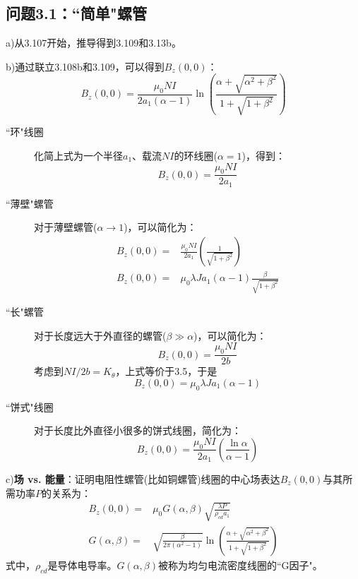 \subsection{问题3.1：``简单"螺管}
a)从3.107开始，推导得到3.109和3.13b。

b)通过联立3.108b和3.109，可以得到$B_z(0,0)$：
\begin{equation}
B_z(0,0)=\frac{\mu_0NI}{2a_1(\alpha-1)}\ln\left(\frac{\alpha+\sqrt{\alpha^2+\beta^2}}{1+\sqrt{1+\beta^2}}\right)%
\end{equation}

\begin{description}
  \item[``环"线圈] 化简上式为一个半径$a_1$、载流$NI$的环线圈($\alpha=1$)，得到：
  \begin{equation}
    B_z(0,0)=\frac{\mu_0NI}{2a_1}%
  \end{equation}
 \item[``薄壁"螺管] 对于薄壁螺管($\alpha \rightarrow 1$)，可以简化为：
 \begin{align*}
   B_z(0,0)=&\frac{\mu_0NI}{2a_1}\left(\frac{1}{\sqrt{1+\beta^2}}\right)\tag{3.111b}\\ %
   B_z(0,0)=&\mu_0 \lambda Ja_1(\alpha-1)\frac{\beta}{\sqrt{1+\beta^2}}\tag{3.111c}%
 \end{align*}
  \item[``长"螺管] 对于长度远大于外直径的螺管($\beta \gg \alpha$)，可以简化为：
\begin{equation*}
B_z(0,0)=\frac{\mu_0NI}{2b} \tag{3.111d}%
\end{equation*}
考虑到$NI/2b=K_\theta$，上式等价于3.5，于是
\begin{equation*}
B_z(0,0)=\mu_0\lambda Ja_1(\alpha-1) \tag{3.111e}%
\end{equation*}
  \item[``饼式"线圈] 对于长度比外直径小很多的饼式线圈，简化为：
  \begin{equation*}
B_z(0,0)=\frac{\mu_0NI}{2a_1}(\frac{\ln\alpha}{\alpha-1}) \tag{3.111f}%
  \end{equation*}
\end{description}

c)\textbf{场 vs. 能量}：证明电阻性螺管(比如铜螺管)线圈的中心场表达$B_z(0,0)$与其所需功率$P$的关系为：
\begin{subequations}
	\begin{align}
B_z(0,0)=&\mu_0G(\alpha,\beta)\sqrt{\frac{\lambda P}{\rho_{cd}a_1}}\\ %
G(\alpha,\beta)=&\sqrt{\frac{\beta}{2\pi(\alpha^2-1)}}\ln(\frac{\alpha+\sqrt{\alpha^2+\beta^2}}{1+\sqrt{1+\beta^2}})%
	\end{align}
\end{subequations}
式中，$\rho_{cd}$是导体电导率。$G(\alpha,\beta)$被称为均匀电流密度线圈的``G因子"。

